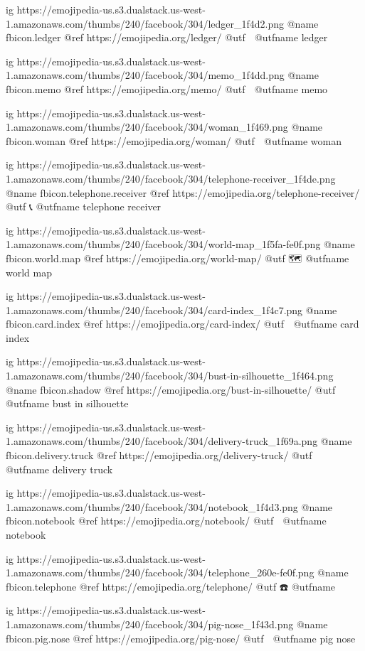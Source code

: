   ig https://emojipedia-us.s3.dualstack.us-west-1.amazonaws.com/thumbs/240/facebook/304/ledger_1f4d2.png
  @name fbicon.ledger
  @ref https://emojipedia.org/ledger/
  @utf 📒
  @utfname ledger

  ig https://emojipedia-us.s3.dualstack.us-west-1.amazonaws.com/thumbs/240/facebook/304/memo_1f4dd.png
  @name fbicon.memo
  @ref https://emojipedia.org/memo/
  @utf 📝
  @utfname memo

  ig https://emojipedia-us.s3.dualstack.us-west-1.amazonaws.com/thumbs/240/facebook/304/woman_1f469.png
  @name fbicon.woman
  @ref https://emojipedia.org/woman/
  @utf 👩
  @utfname woman

  ig https://emojipedia-us.s3.dualstack.us-west-1.amazonaws.com/thumbs/240/facebook/304/telephone-receiver_1f4de.png
  @name fbicon.telephone.receiver
  @ref https://emojipedia.org/telephone-receiver/
  @utf 📞
  @utfname telephone receiver

  ig https://emojipedia-us.s3.dualstack.us-west-1.amazonaws.com/thumbs/240/facebook/304/world-map_1f5fa-fe0f.png
  @name fbicon.world.map
  @ref https://emojipedia.org/world-map/
  @utf 🗺
  @utfname world map

  ig https://emojipedia-us.s3.dualstack.us-west-1.amazonaws.com/thumbs/240/facebook/304/card-index_1f4c7.png
  @name fbicon.card.index
  @ref https://emojipedia.org/card-index/
  @utf 📇
  @utfname card index

  ig https://emojipedia-us.s3.dualstack.us-west-1.amazonaws.com/thumbs/240/facebook/304/bust-in-silhouette_1f464.png
  @name fbicon.shadow
  @ref https://emojipedia.org/bust-in-silhouette/
  @utf 👤
  @utfname bust in silhouette

  ig https://emojipedia-us.s3.dualstack.us-west-1.amazonaws.com/thumbs/240/facebook/304/delivery-truck_1f69a.png
  @name fbicon.delivery.truck
  @ref https://emojipedia.org/delivery-truck/
  @utf 🚚
  @utfname delivery truck

  ig https://emojipedia-us.s3.dualstack.us-west-1.amazonaws.com/thumbs/240/facebook/304/notebook_1f4d3.png
  @name fbicon.notebook
  @ref https://emojipedia.org/notebook/
  @utf 📓
  @utfname notebook

  ig https://emojipedia-us.s3.dualstack.us-west-1.amazonaws.com/thumbs/240/facebook/304/telephone_260e-fe0f.png
  @name fbicon.telephone
  @ref https://emojipedia.org/telephone/
  @utf ☎️
  @utfname

  ig https://emojipedia-us.s3.dualstack.us-west-1.amazonaws.com/thumbs/240/facebook/304/pig-nose_1f43d.png
  @name fbicon.pig.nose
  @ref https://emojipedia.org/pig-nose/
  @utf 🐽
  @utfname pig nose

